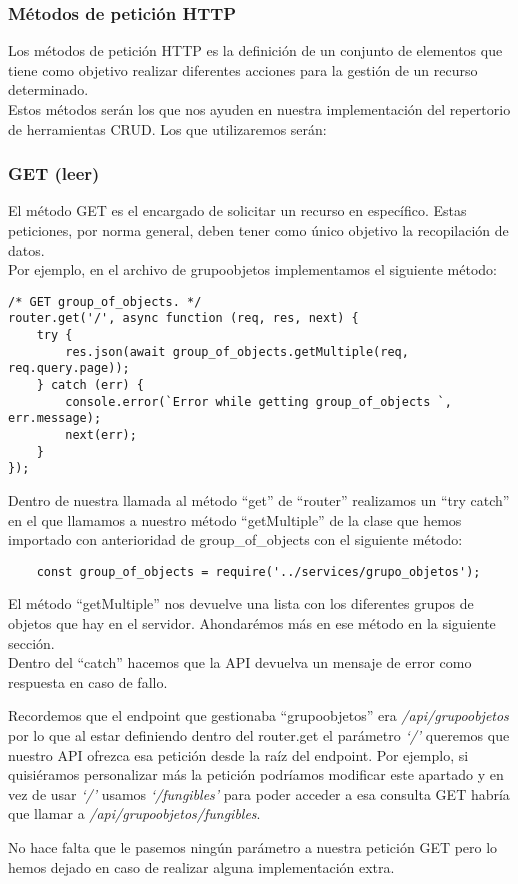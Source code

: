 \subsubsection{Métodos de petición HTTP}
Los métodos de petición HTTP es la definición de un conjunto de elementos que tiene como objetivo realizar diferentes acciones para la gestión de un recurso determinado.
\\Estos métodos serán los que nos ayuden en nuestra implementación del repertorio de herramientas CRUD. Los que utilizaremos serán:

\subsubsection{GET (leer)}
El método GET es el encargado de solicitar un recurso en específico. Estas peticiones, por norma general, deben tener como único objetivo la recopilación de datos.
\\Por ejemplo, en el archivo de grupoobjetos implementamos el siguiente método:
\begin{verbatim}
/* GET group_of_objects. */
router.get('/', async function (req, res, next) {
    try {
        res.json(await group_of_objects.getMultiple(req, req.query.page));
    } catch (err) {
        console.error(`Error while getting group_of_objects `, err.message);
        next(err);
    }
});
\end{verbatim}
Dentro de nuestra llamada al método ``get'' de ``router'' realizamos un ``try catch'' en el que llamamos a nuestro método ``getMultiple'' de la clase que hemos importado con anterioridad de group\_of\_objects con el siguiente método:
\begin{verbatim}
    const group_of_objects = require('../services/grupo_objetos');
\end{verbatim}
El método ``getMultiple'' nos devuelve una lista con los diferentes grupos de objetos que hay en el servidor. Ahondarémos más en ese método en la siguiente sección.
\\Dentro del ``catch'' hacemos que la API devuelva un mensaje de error como respuesta en caso de fallo.
\begin{tcolorbox}
    [colback=green!5!white,colframe=green!75!black,fonttitle=\bfseries,title=Personalización de peticiones]
    Recordemos que el endpoint que gestionaba ``grupoobjetos'' era \textit{/api/grupoobjetos} por lo que al estar definiendo dentro del router.get el parámetro \textit{`/'} queremos que nuestro API ofrezca esa petición desde la raíz del endpoint. Por ejemplo, si quisiéramos personalizar más la petición podríamos modificar este apartado y en vez de usar \textit{`/'} usamos \textit{`/fungibles'} para poder acceder a esa consulta GET habría que llamar a \textit{/api/grupoobjetos/fungibles}.
\end{tcolorbox}
No hace falta que le pasemos ningún parámetro a nuestra petición GET pero lo hemos dejado en caso de realizar alguna implementación extra.

